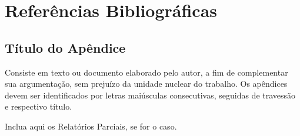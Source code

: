 \documentclass[
	12pt,				%
	openright,			%
	oneside,			%
	a4paper,			%
	english,			%
	french,				%
	spanish,			%
	brazil				%
	]{abntex2}
\begin{document}
\chapter{Referências Bibliográficas}




\postextual



%
%


\begin{apendicesenv}


\chapter{Título do Apêndice}

Consiste em texto ou documento elaborado pelo autor, a fim de complementar sua argumentação, sem prejuízo da unidade nuclear do trabalho. Os apêndices devem ser identificados por letras maiúsculas consecutivas, seguidas de travessão e respectivo título.

Inclua aqui os Relatórios Parciais, se for o caso.

\end{apendicesenv}
\end{document}
